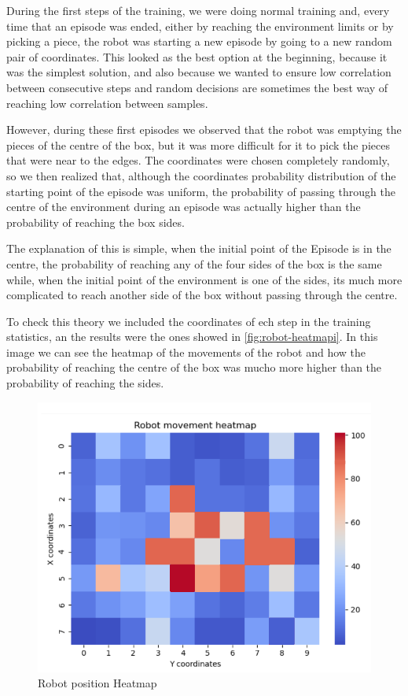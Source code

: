 			During the first steps of the training, we were doing normal training and, every time that an episode was ended, either by reaching the environment limits or by picking a piece, the robot was starting a new episode by going to a new random pair of coordinates. This looked as the best option at the beginning, because it was the simplest solution, and also because we wanted to ensure low correlation between consecutive steps and random decisions are sometimes the best way of reaching low correlation between samples.
			
			However, during these first episodes we observed that the robot was emptying the pieces of the centre of the box, but it was more difficult for it to pick the pieces that were near to the edges. The coordinates were chosen completely randomly, so we then realized that, although the coordinates probability distribution of the starting point of the episode was uniform, the probability of passing through the centre of the environment during an episode was actually higher than the probability of reaching the box sides. 
			
			The explanation of this is simple, when the initial point of the Episode is in the centre, the probability of reaching any of the four sides of the box is the same while, when the initial point of the environment is one of the sides, its much more complicated to reach another side of the box without passing through the centre.
			
			To check this theory we included the coordinates of ech step in the training statistics, an the results were the ones showed in \autoref{fig:robot-heatmapi}. In this image we can see the heatmap of the movements of the robot and how the probability of reaching the centre of the box was mucho more higher than the probability of reaching the sides.
			
			\begin{figure}[H]
				\centering
				\includegraphics[width=0.9\linewidth]{"Images/Robot HeatmapI"}
				\caption[Robot Heatmap]{Robot position Heatmap}
				\label{fig:robot-heatmapi}
			\end{figure}
		
